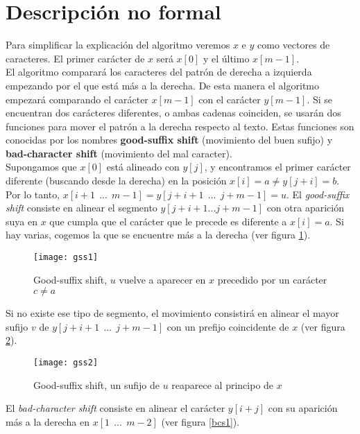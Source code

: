 \section{Descripción no formal}\label{sec:dnf}
Para simplificar la explicación del algoritmo veremos $x$ e $y$ como vectores de caracteres. El primer carácter de $x$ será $x[0]$ y el último $x[m-1]$.\\

El algoritmo comparará los caracteres del patrón de derecha a izquierda empezando por el que está más a la derecha. De esta manera el algoritmo empezará comparando el carácter $x[m-1]$ con el carácter $y[m-1]$. Si se encuentran dos carácteres diferentes, o ambas cadenas coinciden, se usarán dos funciones para mover el patrón a la derecha respecto al texto. Estas funciones son conocidas por los nombres \textbf{good-suffix shift} (movimiento del buen sufijo) y \textbf{bad-character shift} (movimiento del mal caracter).\\ 

Supongamos que $x[0]$ está alineado con $y[j]$, y encontramos el primer carácter diferente (buscando desde la derecha) en la posición $x[i] = a \neq y[j+i] = b$. Por lo tanto, $x[i+1 \ \  ... \ \  m-1] = y[j+i+1 \ \  ... \ \  j+m-1] = u$. El \textit{good-suffix shift} consiste en alinear el segmento $y[j+i+1  ...  j+m-1]$ con otra aparición suya en $x$ que cumpla que el carácter que le precede es diferente a $x[i] = a$. Si hay varias, cogemos la que se encuentre más a la derecha (ver figura \ref{gss1}).\\ 

\begin{figure}[H]
  \centering
    \texttt{[image: gss1]}
  \caption{Good-suffix shift, $u$ vuelve a aparecer en $x$ precedido por un carácter $c \neq a$}
	\label{gss1}
\end{figure}

Si no existe ese tipo de segmento, el movimiento consistirá en alinear el mayor sufijo $v$ de $y[j+i+1 \ \  ... \ \  j+m-1]$ con un prefijo coincidente de $x$ (ver figura \ref{gss2}).\\

\begin{figure}[H]
  \centering
    \texttt{[image: gss2]}
  \caption{Good-suffix shift, un sufijo de $u$ reaparece al principo de $x$}
	\label{gss2}
\end{figure}

El \textit{bad-character shift} consiste en alinear el carácter $y[i+j]$ con su aparición más a la derecha en $x[1 \ \  ... \ \  m-2]$ (ver figura \ref{bcs1}).\\

